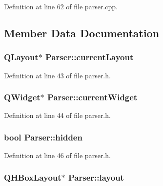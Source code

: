Definition at line 62 of file parser.cpp.



\subsection{Member Data Documentation}
\hypertarget{classParser_a3b94abe3e2c41c419f5be2a2e3fd63a4}{
\subsubsection[{currentLayout}]{\setlength{\rightskip}{0pt plus 5cm}QLayout$\ast$ {\bf Parser::currentLayout}}}
\label{classParser_a3b94abe3e2c41c419f5be2a2e3fd63a4}


Definition at line 43 of file parser.h.

\hypertarget{classParser_a05d665391ab1db7f4729654df9fa4079}{
\subsubsection[{currentWidget}]{\setlength{\rightskip}{0pt plus 5cm}QWidget$\ast$ {\bf Parser::currentWidget}}}
\label{classParser_a05d665391ab1db7f4729654df9fa4079}


Definition at line 44 of file parser.h.

\hypertarget{classParser_a24d2c0cb2595e44b9a7f73d801685e70}{
\subsubsection[{hidden}]{\setlength{\rightskip}{0pt plus 5cm}bool {\bf Parser::hidden}}}
\label{classParser_a24d2c0cb2595e44b9a7f73d801685e70}


Definition at line 46 of file parser.h.

\hypertarget{classParser_a10b118e730f600194f26db151575c6fa}{
\subsubsection[{layout}]{\setlength{\rightskip}{0pt plus 5cm}QHBoxLayout$\ast$ {\bf Parser::layout}}}
\label{classParser_a10b118e730f600194f26db151575c6fa}


